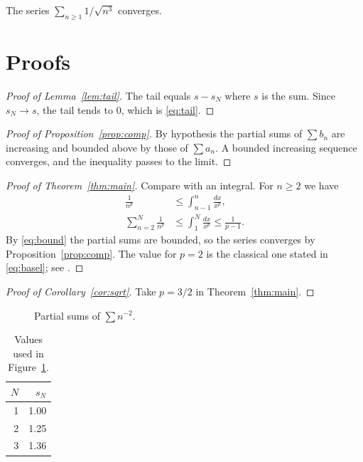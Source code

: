 \begin{corollary}\label{cor:sqrt}
The series $\sum_{n\ge1} 1/\sqrt{n^{3}}$ converges.
\end{corollary}

\section{Proofs}\label{sec:proofs}
\begin{proof}[Proof of Lemma~\ref{lem:tail}]
The tail equals $s-s_N$ where $s$ is the sum. Since $s_N\to s$, the tail tends to $0$,
which is \eqref{eq:tail}.
\end{proof}

\begin{proof}[Proof of Proposition~\ref{prop:comp}]
By hypothesis the partial sums of $\sum b_n$ are increasing and bounded above by those of
$\sum a_n$. A bounded increasing sequence converges, and the inequality passes to the limit.
\end{proof}

\begin{proof}[Proof of Theorem~\ref{thm:main}]
Compare with an integral. For $n\ge2$ we have
\begin{align}
\frac{1}{n^{p}} &\le \int_{n-1}^{n}\frac{dx}{x^{p}}, \label{eq:integral}\\
\sum_{n=2}^{N}\frac{1}{n^{p}} &\le \int_{1}^{N}\frac{dx}{x^{p}}\le\frac{1}{p-1}. \label{eq:bound}
\end{align}
By \eqref{eq:bound} the partial sums are bounded, so the series converges by
Proposition~\ref{prop:comp}. The value for $p=2$ is the classical one stated in
\eqref{eq:basel}; see \cite{alpha}.
\end{proof}

\begin{proof}[Proof of Corollary~\ref{cor:sqrt}]
Take $p=3/2$ in Theorem~\ref{thm:main}.
\end{proof}

\begin{figure}[ht]
\centering
{}
\caption{Partial sums of $\sum n^{-2}$.}\label{fig:partial}
\end{figure}

\begin{table}[ht]
\centering
\caption{Values used in Figure~\ref{fig:partial}.}\label{tab:values}
\begin{tabular}{rr}
$N$ & $s_N$ \\ \hline
1 & 1.00 \\
2 & 1.25 \\
3 & 1.36 \\
\end{tabular}
\end{table}

